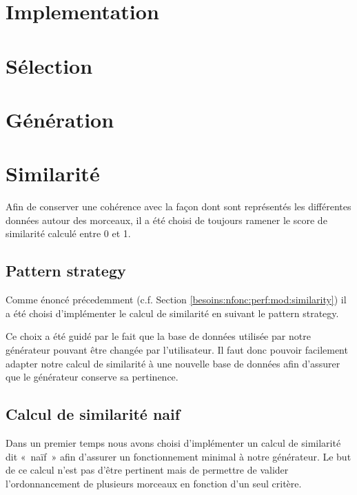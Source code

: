 \section{Implementation}
\label{impl:general}

\section{Sélection}
\label{impl:selection}

\section{Génération}
\label{impl:generation}

\section{Similarité}
\label{impl:similarite}

Afin de conserver une cohérence avec la façon dont sont représentés les différentes données autour des morceaux, il a été choisi de toujours ramener le score de similarité calculé entre 0 et 1.

\subsection{Pattern strategy}
\label{impl:similatite:strategy}

Comme énoncé précedemment (c.f. Section \ref{besoins:nfonc:perf:mod:similarity}) il a été choisi d'implémenter le calcul de similarité en suivant le pattern strategy.\newline

Ce choix a été guidé par le fait que la base de données utilisée par notre générateur pouvant être changée par l'utilisateur. Il faut donc pouvoir facilement adapter notre calcul de similarité à une nouvelle base de données afin d'assurer que le générateur conserve sa pertinence.

\subsection{Calcul de similarité naif}
\label{impl:similarite:naif}

Dans un premier temps nous avons choisi d'implémenter un calcul de similarité dit «~naïf~» afin d'assurer un fonctionnement minimal à notre générateur. 
Le but de ce calcul n'est pas d'être pertinent mais de permettre de valider l'ordonnancement de plusieurs morceaux en fonction d'un seul critère.\newline

